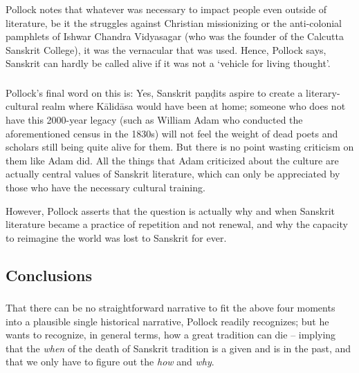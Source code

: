 \subsubsection{} Pollock notes that whatever was necessary to impact people even outside of literature, be it the struggles against Christian missionizing or the anti-colonial pamphlets of Ishwar Chandra Vidyasagar (who was the founder of the Calcutta Sanskrit College), it was the vernacular that was used. Hence, Pollock says, Sanskrit can hardly be called alive if it was not a ‘vehicle for living thought’. 

\subsubsection{} Pollock’s final word on this is: Yes, Sanskrit paṇḍits aspire to create a literary-cultural realm where Kālidāsa would have been at home; someone who does not have this 2000-year legacy (such as William Adam who conducted the aforementioned census in the 1830s) will not feel the weight of dead poets and scholars still being quite alive for them. But there is no point wasting criticism on them like Adam did. All the things that Adam criticized about the culture are actually central values of Sanskrit literature, which can only be appreciated by those who have the necessary cultural training.

However, Pollock asserts that the question is actually why and when Sanskrit literature became a practice of repetition and not renewal, and why the capacity to reimagine the world was lost to Sanskrit for ever.

\subsection{Conclusions}
\vskip -5pt

\subsubsection{} That there can be no straightforward narrative to fit the above four moments into a plausible single historical narrative, Pollock readily recognizes; but he wants to recognize, in general terms, how a great tradition can die – implying that the {\sl when} of the death of Sanskrit tradition is a given and is in the past, and that we only have to figure out the {\sl how} and {\sl why}. 

